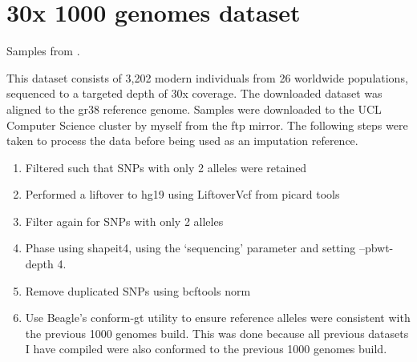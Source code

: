 \section{30x 1000 genomes dataset} \label{section:1000genomes}


Samples from \cite{byrska2021high}.

This dataset consists of 3,202 modern individuals from 26 worldwide populations, sequenced to a targeted depth of 30x coverage. The downloaded dataset was aligned to the gr38 reference genome. Samples were downloaded to the UCL Computer Science cluster by myself from the ftp mirror. The following steps were taken to process the data before being used as an imputation reference. 

\begin{enumerate}
\item Filtered such that SNPs with only 2 alleles were retained
\item Performed a liftover to hg19 using LiftoverVcf from picard tools \cite{Picard2018toolkit}
\item Filter again for SNPs with only 2 alleles
\item Phase using shapeit4, using the `sequencing' parameter and setting --pbwt-depth 4.
\item Remove duplicated SNPs using bcftools norm \cite{li2009sequence} 
\item Use Beagle's conform-gt utility to ensure reference alleles were consistent with the previous 1000 genomes build. This was done because all previous datasets I have compiled were also conformed to the previous 1000 genomes build. 
\end{enumerate}

